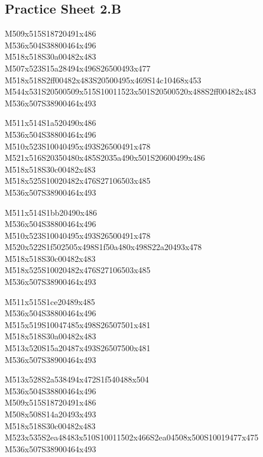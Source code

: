 \documentclass{article}
\begin{document}
\subsection{Practice Sheet 2.B}

\begin{multicols}{5}
\begin{center}
M509x515S18720491x486 %
\\M536x504S38800464x496 %
\\M518x518S30a00482x483 %
\\M507x523S15a28494x496S26500493x477 %
\\M518x518S2ff00482x483S20500495x469S14c10468x453 %
\\M544x531S20500509x515S10011523x501S20500520x488S2ff00482x483 %
\\M536x507S38900464x493 %
\vfil
\columnbreak

M511x514S1a520490x486 %
\\M536x504S38800464x496 %
\\M510x523S10040495x493S26500491x478 %
\\M521x516S20350480x485S2035a490x501S20600499x486 %
\\M518x518S30c00482x483 %
\\M518x525S10020482x476S27106503x485 %
\\M536x507S38900464x493 %
\vfil
\columnbreak

M511x514S1bb20490x486 %
\\M536x504S38800464x496 %
\\M510x523S10040495x493S26500491x478 %
\\M520x522S1f502505x498S1f50a480x498S22a20493x478 %
\\M518x518S30c00482x483 %
\\M518x525S10020482x476S27106503x485 %
\\M536x507S38900464x493 %
\vfil
\columnbreak

M511x515S1ce20489x485 %
\\M536x504S38800464x496 %
\\M515x519S10047485x498S26507501x481 %
\\M518x518S30a00482x483 %
\\M513x520S15a20487x493S26507500x481 %
\\M536x507S38900464x493 %
\vfil
\columnbreak

M513x528S2a538494x472S1f540488x504 %
\\M536x504S38800464x496 %
\\M509x515S18720491x486 %
\\M508x508S14a20493x493 %
\\M518x518S30c00482x483 %
\\M523x535S2ea48483x510S10011502x466S2ea04508x500S10019477x475 %
\\M536x507S38900464x493 %
\vfil

\end{center}
\end{multicols}
\end{document}
